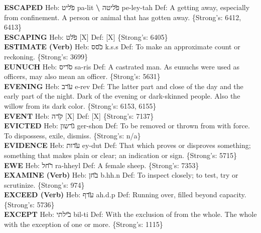 {\textbf{ESCAPED} Heb: {\large\H פליט} pa-lit \textbf{\textbackslash{}} {\large\H פליטה} pe-ley-tah Def: A getting away, especially from confinement. A person or animal that has gotten away. \{Strong's: 6412, 6413\}\hfill{}\\

\textbf{ESCAPING} Heb: {\large\H פלט} {[}X{]} Def: {[}X{]} \{Strong's: 6405\}\hfill{}\\

\textbf{ESTIMATE (Verb)} Heb: {\large\H כסס} k.s.s Def: To make an approximate count or reckoning. \{Strong's: 3699\}\hfill{}\\

\textbf{EUNUCH} Heb: {\large\H סריס} sa-ris Def: A castrated man. As eunuchs were used as officers, may also mean an officer. \{Strong's: 5631\}\hfill{}\\

\textbf{EVENING} Heb: {\large\H ערב} e-rev Def: The latter part and close of the day and the early part of the night. Dark of the evening or dark-skinned people. Also the willow from its dark color. \{Strong's: 6153, 6155\}\hfill{}\\

\textbf{EVENT} Heb: {\large\H קרה} {[}X{]} Def: {[}X{]} \{Strong's: 7137\}\hfill{}\\

\textbf{EVICTED} Heb: {\large\H גרשון} ger-shon Def: To be removed or thrown from with force. To dispossess, exile, dismiss. \{Strong's: n/a\}\hfill{}\\

\textbf{EVIDENCE} Heb: {\large\H עדות} ey-dut Def: That which proves or disproves something; something that makes plain or clear; an indication or sign. \{Strong's: 5715\}\hfill{}\\

\textbf{EWE} Heb: {\large\H רחל} ra-hheyl Def: A female sheep. \{Strong's: 7353\}\hfill{}\\

\textbf{EXAMINE (Verb)} Heb: {\large\H בחן} b.hh.n Def: To inspect closely; to test, try or scrutinize. \{Strong's: 974\}\hfill{}\\

\textbf{EXCEED (Verb)} Heb: {\large\H עדף} ah.d.p Def: Running over, filled beyond capacity. \{Strong's: 5736\}\hfill{}\\

\textbf{EXCEPT} Heb: {\large\H בילתי} bil-ti Def: With the exclusion of from the whole. The whole with the exception of one or more. \{Strong's: 1115\}\hfill{}\\

}
